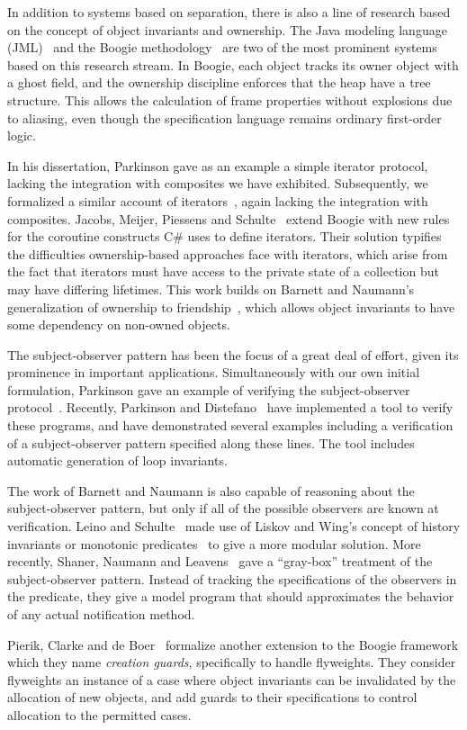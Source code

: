 In addition to systems based on separation, there is also a line of
research based on the concept of object invariants and ownership.  The
Java modeling language (JML)~\cite{jml} and the Boogie
methodology~\cite{boogie} are two of the most prominent systems based
on this research stream. In Boogie, each object tracks its owner
object with a ghost field, and the ownership discipline enforces that
the heap have a tree structure. This allows the calculation of frame
properties without explosions due to aliasing, even though the
specification language remains ordinary first-order logic.

In his dissertation, Parkinson gave as an example a simple iterator
protocol, lacking the integration with composites we have exhibited.
Subsequently, we formalized a similar account of
iterators~\cite{iterator}, again lacking the integration with
composites. Jacobs, Meijer, Piessens and
Schulte~\cite{iterators-revisited} extend Boogie with new rules for
the coroutine constructs C\# uses to define iterators. Their solution
typifies the difficulties ownership-based approaches face with
iterators, which arise from the fact that iterators must have access
to the private state of a collection but may have differing
lifetimes. This work builds on Barnett and Naumann's generalization of
ownership to friendship~\cite{friends}, which allows object invariants
to have some dependency on non-owned objects.

The subject-observer pattern has been the focus of a great deal of effort,
given its prominence in important applications. Simultaneously with our own
initial formulation, Parkinson gave an example of verifying the
subject-observer protocol~\cite{parkinson-iwaco-07}. Recently, Parkinson and
Distefano~\cite{jstar-parkinson-distefano} have implemented a tool to verify
these programs, and have demonstrated several examples including a verification
of a subject-observer pattern specified along these lines. The tool includes
automatic generation of loop invariants. 

The work of Barnett and Naumann is also capable of reasoning about the
subject-observer pattern, but only if all of the possible observers
are known at verification.  Leino and Schulte~\cite{boogie-sub-obs}
made use of Liskov and Wing's concept of history invariants or
monotonic predicates~\cite{liskov-wing} to give a more modular
solution. More recently, Shaner, Naumann and Leavens~\cite{ShanerLN07}
gave a ``gray-box'' treatment of the subject-observer pattern.
Instead of tracking the specifications of the observers in the
predicate, they give a model program that should approximates the
behavior of any actual notification method.

Pierik, Clarke and de Boer~\cite{creational-invariants} formalize another
extension to the Boogie framework which they name \emph{creation
  guards}, specifically to handle flyweights. They consider flyweights
an instance of a case where object invariants can be invalidated by
the allocation of new objects, and add guards to their specifications
to control allocation to the permitted cases. 



